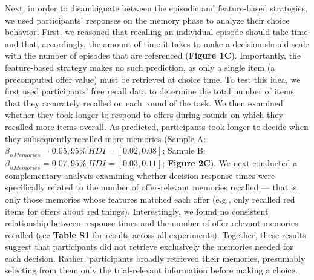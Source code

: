 \documentclass[10pt,letterpaper]{article}
\begin{document}
Next, in order to disambiguate between the episodic and feature-based strategies, we used participants' responses on the memory phase to analyze their choice behavior. First, we reasoned that recalling an individual episode should take time\cite{ratcliffTheoryMemoryRetrieval1978, sederbergContextbasedTheoryRecency2008, kahanaFoundationsHumanMemory2012} and that, accordingly, the amount of time it takes to make a decision should scale with the number of episodes that are referenced (\textbf{Figure 1C}). Importantly, the feature-based strategy makes no such prediction, as only a single item (a precomputed offer value) must be retrieved at choice time. To test this idea, we first used participants' free recall data to determine the total number of items that they accurately recalled on each round of the task. We then examined whether they took longer to respond to offers during rounds on which they recalled more items overall. As predicted, participants took longer to decide when they subsequently recalled more memories (Sample A: $\beta_{nMemories} = 0.05, 95\% \ HDI = [0.02, 0.08]$; Sample B: $\beta_{nMemories} = 0.07, 95\% \ HDI = [0.03, 0.11]$; \textbf{Figure 2C}). We next conducted a complementary analysis examining whether decision response times were specifically related to the number of offer-relevant memories recalled --- that is, only those memories whose features matched each offer (e.g., only recalled red items for offers about red things). Interestingly, we found no consistent relationship between response times and the number of offer-relevant memories recalled (see \textbf{Table S1} for results across all experiments). Together, these results suggest that participants did not retrieve exclusively the memories needed for each decision. Rather, participants broadly retrieved their memories, presumably selecting from them only the trial-relevant information before making a choice.
\end{document}
